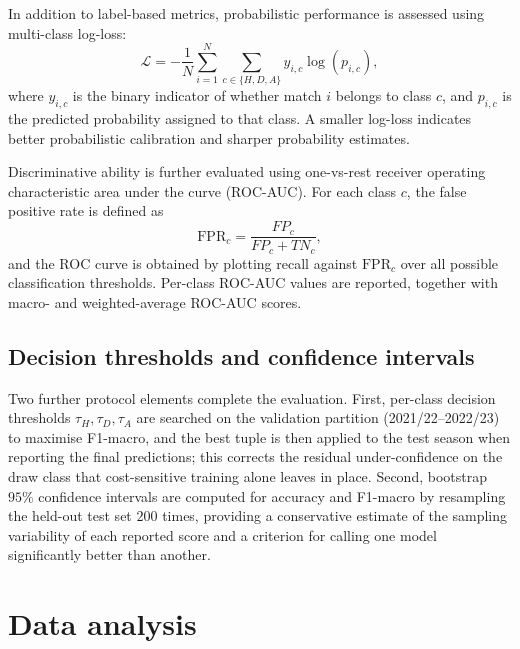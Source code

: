 \documentclass[pdflatex,sn-mathphys-num]{sn-jnl}
\theoremstyle{thmstyleone}
\theoremstyle{thmstyletwo}
\theoremstyle{thmstylethree}
\begin{document}
In addition to label-based metrics, probabilistic performance is
assessed using multi-class log-loss:
\begin{equation}
\mathcal{L}
=
-\frac{1}{N}
\sum_{i=1}^{N}\sum_{c\in\{H,D,A\}}
y_{i,c}\log\left(p_{i,c}\right),
\label{eq:logloss}
\end{equation}
where $y_{i,c}$ is the binary indicator of whether match $i$ belongs
to class $c$, and $p_{i,c}$ is the predicted probability assigned to
that class. A smaller log-loss indicates better probabilistic
calibration and sharper probability estimates.

Discriminative ability is further evaluated using one-vs-rest
receiver operating characteristic area under the curve
(ROC-AUC). For each class $c$, the false positive rate is defined as
\begin{equation}
\mathrm{FPR}_{c}
=
\frac{FP_{c}}{FP_{c}+TN_{c}},
\label{eq:fpr}
\end{equation}
and the ROC curve is obtained by plotting recall against
$\mathrm{FPR}_{c}$ over all possible classification thresholds.
Per-class ROC-AUC values are reported, together with macro- and
weighted-average ROC-AUC scores.

\subsection{Decision thresholds and confidence intervals}
\label{subsec:threshold-ci}

Two further protocol elements complete the evaluation. First, per-class
decision thresholds $\tau_H,\tau_D,\tau_A$ are searched on the
validation partition (2021/22--2022/23) to maximise F1-macro, and
the best tuple is then applied to the test season when reporting
the final predictions; this corrects the residual under-confidence
on the draw class that cost-sensitive training alone leaves in
place. Second, bootstrap $95\%$ confidence intervals are
computed for accuracy and F1-macro by resampling the held-out test
set $200$ times, providing a conservative estimate of the sampling
variability of each reported score and a criterion for calling one
model significantly better than another.

\section{Data analysis}\label{sec:dataanalysis}
\end{document}
